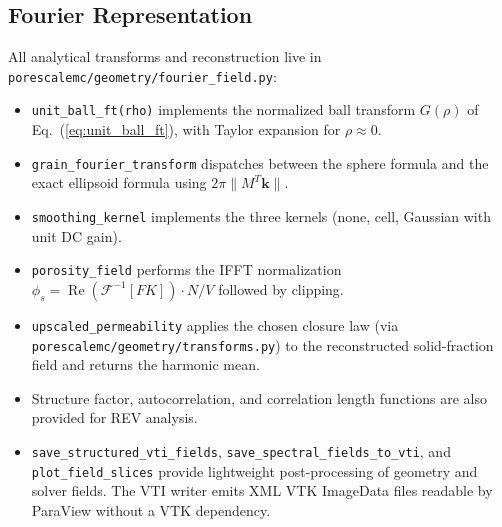 \documentclass[preprint,12pt]{elsarticle}
\newcommand{\kvec}{\mathbf{k}}
\begin{document}
\subsection{Fourier Representation}
All analytical transforms and reconstruction live in \texttt{porescalemc/geometry/fourier\_field.py}:
\begin{itemize}
  \item \texttt{unit\_ball\_ft(rho)} implements the normalized ball transform $G(\rho)$ of Eq.~(\ref{eq:unit_ball_ft}), with Taylor expansion for $\rho \approx 0$.
  \item \texttt{grain\_fourier\_transform} dispatches between the sphere formula and the exact ellipsoid formula using $2\pi \|M^T \kvec\|$.
  \item \texttt{smoothing\_kernel} implements the three kernels (none, cell, Gaussian with unit DC gain).
  \item \texttt{porosity\_field} performs the IFFT normalization $\phi_s = \operatorname{Re}(\mathcal{F}^{-1}[F K]) \cdot N / V$ followed by clipping.
  \item \texttt{upscaled\_permeability} applies the chosen closure law (via \texttt{porescalemc/geometry/transforms.py}) to the reconstructed solid-fraction field and returns the harmonic mean.
  \item Structure factor, autocorrelation, and correlation length functions are also provided for REV analysis.
  \item \texttt{save\_structured\_vti\_fields}, \texttt{save\_spectral\_fields\_to\_vti}, and \texttt{plot\_field\_slices} provide lightweight post-processing of geometry and solver fields. The VTI writer emits XML VTK ImageData files readable by ParaView without a VTK dependency.
\end{itemize}
\end{document}
